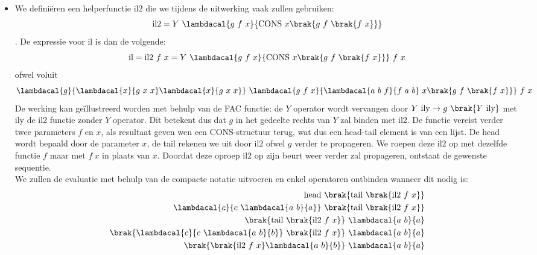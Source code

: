 \documentclass[fleqn]{article}
\newcommand{\cons}{\mbox{CONS}}
\begin{document}
\begin{answer}\hfill
\begin{itemize}
 \item We defini\"eren een helperfunctie $\mbox{il2}$ die we tijdens de uitwerking vaak zullen gebruiken:
 \begin{equation}
  \mbox{il2} = Y\ \lambdacal{g\ f\ x}{\cons\ x \brak{g\ f\ \brak{f\ x}}}
 \end{equation}
 . De expressie voor $\mbox{il}$ is dan de volgende:
\begin{equation}
\mbox{il}=\mbox{il2}\ f\ x = Y\ \lambdacal{g\ f\ x}{\cons\ x \brak{g\ f\ \brak{f\ x}}}\ f\ x
\end{equation} ofwel voluit
\begin{equation}
\lambdacal{g}{\lambdacal{x}{g\ x\ x}\lambdacal{x}{g\ x\ x}}\ \lambdacal{g\ f\ x}{\lambdacal{a\ b\ f}{f\ a\ b}\ x \brak{g\ f\ \brak{f\ x}}}\ f\ x
\end{equation}
De werking kan ge\"illustreerd worden met behulp van de \mbox{FAC} functie: de $Y$ operator wordt vervangen door $Y\ \mbox{ily}\rightarrow g\ \brak{Y\ \mbox{ily}}$ met $\mbox{ily}$ de $\mbox{il2}$ functie zonder $Y$ operator. Dit betekent dus dat $g$ in het gedeelte rechts van $Y$ zal binden met $\mbox{il2}$. De functie vereist verder twee parameters $f$ en $x$, als resultaat geven wen een $\mbox{CONS}$-structuur terug, wat dus een head-tail element is van een lijst. De head wordt bepaald door de parameter $x$, de tail rekenen we uit door $\mbox{il2}$ ofwel $g$ verder te propageren. We roepen deze $\mbox{il2}$ op met dezelfde functie $f$ maar met $f\ x$ in plaats van $x$. Doordat deze oproep $\mbox{il2}$ op zijn beurt weer verder zal propageren, ontstaat de gewenste sequentie.\\
We zullen de evaluatie met behulp van de compacte notatie uitvoeren en enkel operatoren ontbinden wanneer dit nodig is:
\begin{eqnarray}
\mbox{head}\ \brak{\mbox{tail}\ \brak{\mbox{il2}\ f\ x}}\hfill\\
\lambdacal{c}{c\ \lambdacal{a\ b}{a}}\ \brak{\mbox{tail}\ \brak{ \mbox{il2}\ f\ x }}\hfill\\
\brak{\mbox{tail}\ \brak{ \mbox{il2}\ f\ x }}\ \lambdacal{a\ b}{a}\hfill\\
\brak{\lambdacal{c}{c\ \lambdacal{a\ b}{b}}\ \brak{ \mbox{il2}\ f\ x }}\ \lambdacal{a\ b}{a}\hfill\\
\brak{\brak{ \mbox{il2}\ f\ x } \lambdacal{a\ b}{b}}\ \lambdacal{a\ b}{a}\hfill\\

\end{eqnarray}
\end{itemize}
\end{answer}
\end{document}
